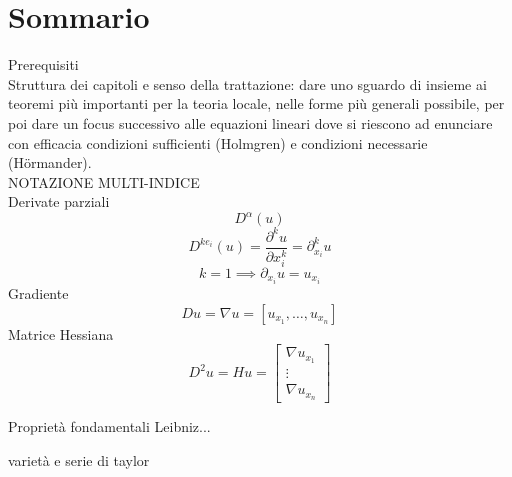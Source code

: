 \chapter*{Sommario}
Prerequisiti\\
Struttura dei capitoli e senso della trattazione: dare uno sguardo di insieme ai teoremi più importanti per la teoria locale, 
nelle forme più generali possibile, per poi dare un focus successivo alle equazioni lineari 
dove si riescono ad enunciare con efficacia condizioni sufficienti (Holmgren) e condizioni necessarie (Hörmander).\\
NOTAZIONE MULTI-INDICE\\
Derivate parziali
$$D^\alpha(u)$$
$$D^{ke_i}(u)=\frac{\partial ^ku}{\partial x_i^k}=\partial ^k_{x_i}u$$
$$k=1 \implies \partial _{x_i}u=u_{x_i}$$
Gradiente
$$Du=\nabla u=\left[u_{x_1},\ldots,u_{x_n}\right]$$
Matrice Hessiana
$$D^2u=Hu=\left[
\begin{matrix}
\nabla u_{x_1}\\
\vdots\\
\nabla u_{x_n}
\end{matrix}
\right]$$

Proprietà fondamentali
Leibniz...

varietà e serie di taylor
